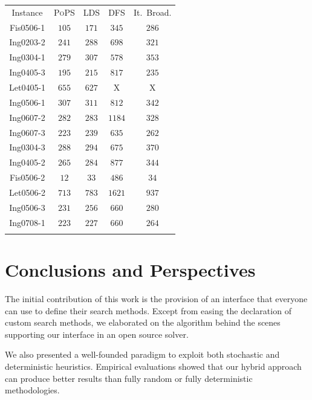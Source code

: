 \documentclass{ws-ijait}
\begin{document}
\begin{table}
  {\begin{tabular}{ccccc}
    \toprule
              Instance & \textsc{PoPS} & LDS & DFS & It.\ Broad. \\
    \colrule
    \textsf{Fis0506-1} & $\mathit{105}$ & $171$ &  $345$ & $286$ \\
    \textsf{Ing0203-2} & $\mathit{241}$ & $288$ &  $698$ & $321$ \\
    \textsf{Ing0304-1} & $\mathit{279}$ & $307$ &  $578$ & $353$ \\
    \textsf{Ing0405-3} & $\mathit{195}$ & $215$ &  $817$ & $235$ \\
    \textsf{Let0405-1} & $655$ & $\mathit{627}$ &    X   &   X   \\
    \textsf{Ing0506-1} & $\mathit{307}$ & $311$ &  $812$ & $342$ \\
    \textsf{Ing0607-2} & $\mathit{282}$ & $283$ & $1184$ & $328$ \\
    \textsf{Ing0607-3} & $\mathit{223}$ & $239$ &  $635$ & $262$ \\
    \textsf{Ing0304-3} & $\mathit{288}$ & $294$ &  $675$ & $370$ \\
    \textsf{Ing0405-2} & $\mathit{265}$ & $284$ &  $877$ & $344$ \\
    \textsf{Fis0506-2} &  $\mathit{12}$ &  $33$ &  $486$ &  $34$ \\
    \textsf{Let0506-2} & $\mathit{713}$ & $783$ & $1621$ & $937$ \\
    \textsf{Ing0506-3} & $\mathit{231}$ & $256$ &  $660$ & $280$ \\
    \textsf{Ing0708-1} & $\mathit{223}$ & $227$ &  $660$ & $264$ \\
    \botrule
  \end{tabular}}
\end{table}


\section{Conclusions and Perspectives}

The initial contribution of this work is the provision of an
interface that everyone can use to define their search
methods. Except from easing the declaration of custom search
methods, we elaborated on the algorithm behind the scenes
supporting our interface in an open source solver.

We also presented a well-founded paradigm to exploit both
stochastic and deterministic heuristics. Empirical
evaluations showed that our hybrid approach can produce
better results than fully random or fully deterministic
methodologies.
\end{document}
